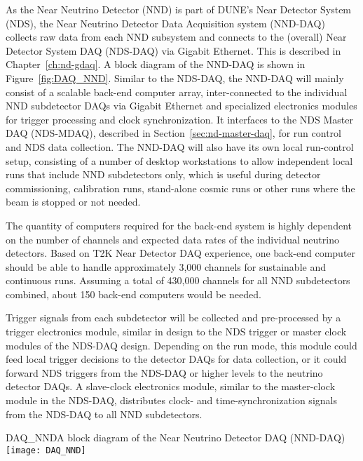 
As the Near Neutrino Detector (NND) is part of DUNE's Near Detector System (NDS), the Near Neutrino Detector Data Acquisition system (NND-DAQ) collects raw data from 
each %
NND subsystem and connects to the (overall) Near 
Detector System DAQ (NDS-DAQ) via Gigabit Ethernet. This is described in 
Chapter~\ref{ch:nd-gdaq}. A block diagram of the NND-DAQ is
shown in Figure~\ref{fig:DAQ_NND}.
Similar to the NDS-DAQ, the NND-DAQ will mainly consist 
of a scalable back-end computer array, inter-connected to the individual NND 
subdetector DAQs via Gigabit Ethernet and specialized electronics modules for trigger 
processing and clock synchronization. It interfaces to the NDS Master DAQ (NDS-MDAQ),
described in Section~\ref{sec:nd-master-daq}, for 
run control and NDS  data collection. The NND-DAQ will also have its own local run-control setup, 
consisting of a number of desktop workstations to allow independent local runs that include 
NND subdetectors only, which is useful during detector commissioning, calibration runs, 
stand-alone cosmic runs or other runs where the beam is stopped or not needed.

The quantity of computers required for the back-end system is highly dependent on the 
number of channels and expected data rates of the individual neutrino detectors. Based on 
T2K Near Detector DAQ experience, one back-end computer should be able to handle 
approximately 3,000 channels for sustainable and continuous runs. Assuming a total of 
430,000 channels for all NND subdetectors combined, about 150 back-end computers would be 
needed.

Trigger signals from each subdetector will be collected and pre-processed by a 
trigger electronics module, similar in design to the NDS %
 trigger or master clock modules 
of the NDS-DAQ design. Depending on the run mode, this module could feed local trigger 
decisions to the detector DAQs for data collection, or it could forward NDS %
triggers 
from the NDS-DAQ or higher levels to the neutrino detector DAQs.  A slave-clock electronics 
module, similar to the master-clock module in the NDS-DAQ, distributes clock- and 
time-synchronization signals from the NDS-DAQ to all NND subdetectors.


\begin{cdrfigure}{DAQ_NND}{A block diagram of the Near Neutrino Detector DAQ (NND-DAQ)}
\texttt{[image: DAQ\_NND]}
\end{cdrfigure}


